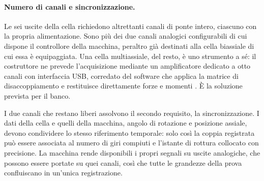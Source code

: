 \paragraph{Numero di canali e sincronizzazione.}
Le sei uscite della cella richiedono altrettanti canali di ponte intero, ciascuno
con la propria alimentazione. Sono più dei due canali analogici configurabili di
cui dispone il controllore della macchina, peraltro già destinati alla cella
biassiale di cui essa è equipaggiata. Una cella multiassiale, del resto, è uno
strumento a sé: il costruttore ne prevede l'acquisizione mediante un
amplificatore dedicato a otto canali con interfaccia USB, corredato del software
che applica la matrice di disaccoppiamento e restituisce direttamente forze e
momenti \cite{interface6a}. È la soluzione prevista per il banco.

I due canali che restano liberi assolvono il secondo requisito, la
sincronizzazione. I dati della cella e quelli della macchina, angolo di rotazione
e posizione assiale, devono condividere lo stesso riferimento temporale: solo
così la coppia registrata può essere associata al numero di giri compiuti e
l'istante di rottura collocato con precisione. La macchina rende disponibili i
propri segnali su uscite analogiche, che possono essere portate su quei canali,
così che tutte le grandezze della prova confluiscano in un'unica registrazione.

